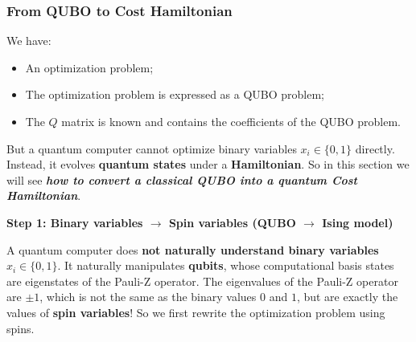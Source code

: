 \subsubsection{From QUBO to Cost Hamiltonian}\label{sec:from-qubo-to-cost-hamiltonian}

We have:
\begin{itemize}
    \item An optimization problem;
    \item The optimization problem is expressed as a QUBO problem;
    \item The $Q$ matrix is known and contains the coefficients of the QUBO problem.
\end{itemize}
But a quantum computer cannot optimize binary variables $x_i \in \{0, 1\}$ directly. Instead, it evolves \textbf{quantum states} under a \textbf{Hamiltonian}. So in this section we will see \textbf{\emph{how to convert a classical QUBO into a quantum Cost Hamiltonian}}.

\highspace
\begin{flushleft}
    \textcolor{Green3}{ \textbf{Step 1: Binary variables $\to$ Spin variables (QUBO $\to$ Ising model)}}
\end{flushleft}
A quantum computer does \textbf{not naturally understand binary variables} $x_i \in \{0, 1\}$. It naturally manipulates \textbf{qubits}, whose computational basis states are eigenstates of the Pauli-Z operator. The eigenvalues of the Pauli-Z operator are $\pm 1$, which is not the same as the binary values $0$ and $1$, but are exactly the values of \textbf{spin variables}! So we first rewrite the optimization problem using spins.

